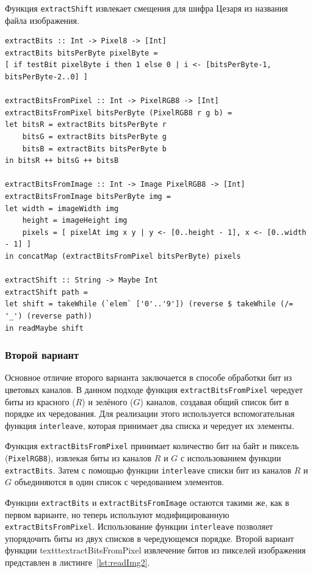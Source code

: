 \documentclass[11pt,a4paper,final]{article} %
\begin{document}
Функция \texttt{extractShift} извлекает смещения для шифра Цезаря из названия файла изображения.

\begin{lstlisting}[caption={Функции для чтения зашифрованных данных из изображения.}, label={lst:readImg}]
extractBits :: Int -> Pixel8 -> [Int]
extractBits bitsPerByte pixelByte = 
[ if testBit pixelByte i then 1 else 0 | i <- [bitsPerByte-1, bitsPerByte-2..0] ] 

extractBitsFromPixel :: Int -> PixelRGB8 -> [Int]
extractBitsFromPixel bitsPerByte (PixelRGB8 r g b) =
let bitsR = extractBits bitsPerByte r
	bitsG = extractBits bitsPerByte g
	bitsB = extractBits bitsPerByte b
in bitsR ++ bitsG ++ bitsB

extractBitsFromImage :: Int -> Image PixelRGB8 -> [Int]
extractBitsFromImage bitsPerByte img = 
let width = imageWidth img
	height = imageHeight img
	pixels = [ pixelAt img x y | y <- [0..height - 1], x <- [0..width - 1] ]
in concatMap (extractBitsFromPixel bitsPerByte) pixels

extractShift :: String -> Maybe Int
extractShift path = 
let shift = takeWhile (`elem` ['0'..'9']) (reverse $ takeWhile (/= '_') (reverse path))
in readMaybe shift
\end{lstlisting}

\subsubsection{Второй вариант}

 Основное отличие второго варианта заключается в способе обработки бит из цветовых каналов. В данном подходе функция \texttt{extractBitsFromPixel} чередует биты из красного (\(R\)) и зелёного (\(G\)) каналов, создавая общий список бит в порядке их чередования. Для реализации этого используется вспомогательная функция \texttt{interleave}, которая принимает два списка и чередует их элементы.

Функция \texttt{extractBitsFromPixel} принимает количество бит на байт и пиксель (\texttt{PixelRGB8}), извлекая биты из каналов \(R\) и \(G\) с использованием функции \texttt{extractBits}. Затем с помощью функции \texttt{interleave} списки бит из каналов \(R\) и \(G\) объединяются в один список с чередованием элементов. 

Функции \texttt{extractBits} и \texttt{extractBitsFromImage} остаются такими же, как в первом варианте, но теперь используют модифицированную \texttt{extractBitsFromPixel}. Использование функции \texttt{interleave} позволяет упорядочить биты из двух списков в чередующемся порядке. Второй вариант функции texttt{extractBitsFromPixel} извлечение битов из пикселей изображения представлен в листинге~\ref{lst:readImg2}.
\end{document}
